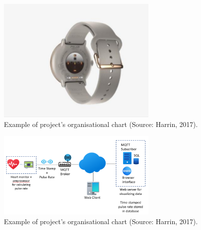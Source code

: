 \documentclass{article}
\begin{document}
\begin{figure}[h]
  \centering
  \includegraphics[width=0.7\textwidth]{watch2.png}
  \caption{ Example of project's organisational chart (Source: Harrin, 2017).}
  \label{harrin}
\end{figure}
\begin{figure}[h]
  \centering
  \includegraphics[width=0.7\textwidth]{web_server.png}
  \caption{ Example of project's organisational chart (Source: Harrin, 2017).}
  \label{harrin}
\end{figure}
\end{document}
